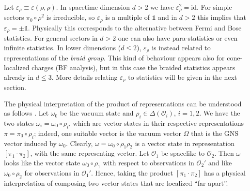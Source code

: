 \documentclass[12pt]{article}
\newcommand{\1}{\mathds{1}}                         %
\newcommand{\Ocal}{\mathcal{O}}
\newcommand{\id}{{\textrm{id}}}
\newtheorem{proposition}[theorem]{Proposition}
\begin{document}
Let $\varepsilon_\rho\equiv\varepsilon(\rho,\rho)$. In spacetime dimension $d>2$ we have $\varepsilon_\rho^2=\id$. For simple sectors $\pi_0\circ \rho^2$ is irreducible, so $\varepsilon_\rho$ is a multiple of $\1$ and in $d>2$ this implies that $\varepsilon_\rho=\pm \1$. Physically this corresponds to the alternative between Fermi and Bose statistics. For general sectors in $d>2$ one can also have para-statistics or even infinite statistics. In lower dimensions ($d\leq 2$), $\varepsilon_\rho$ is instead related to representations of the \emph{braid group}. This kind of behaviour appears also for cone-localized charges (BF analysis), but in this case the braided statistics appears already in $d\leq 3$. More details relating $\varepsilon_\rho$ to statistics will be given in the next section. 

The physical interpretation of the product of representations can be understood as follows \cite{DHR3}. Let $\omega_0$ be the vacuum state and $\rho_i\in\Delta(\Ocal_i)$, $i=1,2$. We have the two states $\omega_i=\omega_0\circ \rho_i$, which are vector states in their respective representations $\pi=\pi_0\circ \rho_i$; indeed, one suitable vector is the vacuum vector $\Omega$ that is the GNS vector induced by $\omega_0$. Clearly, $\omega=\omega_0\circ \rho_1\rho_2$ is a vector state in representation $[\pi_1\cdot \pi_2]$, with the same representing vector. Let
$\Ocal_1$ be spacelike to $\Ocal_2$. Then $\omega$
 looks like the vector state $\omega_0\circ\rho_1$ with respect to observations in $\Ocal_2'$ and like $\omega_0\circ\rho_2$ for observations in $\Ocal_1'$. Hence, taking the product $[\pi_1\cdot \pi_2]$ has a physical interpretation of composing two vector states that are localized ``far apart''.
\end{document}
